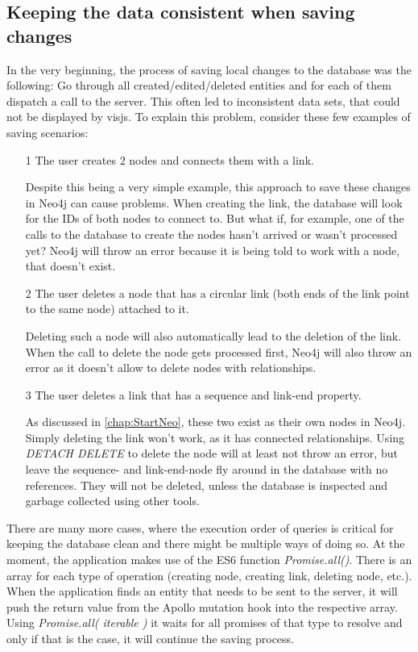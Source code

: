 \subsection{Keeping the data consistent when saving changes}
In the very beginning, the process of saving local changes to the database was the following: Go through all created/edited/deleted entities and for each of them dispatch a call to the server. This often led to inconsistent data sets, that could not be displayed by visjs. To explain this problem, consider these few examples of saving scenarios:
\begin{itemize}
\item[1] The user creates 2 nodes and connects them with a link.

Despite this being a very simple example, this approach to save these changes in Neo4j can cause problems. When creating the link, the database will look for the IDs of both nodes to connect to. But what if, for example, one of the calls to the database to create the nodes hasn't arrived or wasn't processed yet? Neo4j will throw an error because it is being told to work with a node, that doesn't exist.

\item[2] The user deletes a node that has a circular link (both ends of the link point to the same node) attached to it.

Deleting such a node will also automatically lead to the deletion of the link. When the call to delete the node gets processed first, Neo4j will also throw an error as it doesn't allow to delete nodes with relationships.

\item[3] The user deletes a link that has a sequence and link-end property.

As discussed in \autoref{chap:StartNeo}, these two exist as their own nodes in Neo4j. Simply deleting the link won't work, as it has connected relationships. Using \emph{DETACH DELETE} to delete the node will at least not throw an error, but leave the sequence- and link-end-node fly around in the database with no references. They will not be deleted, unless the database is inspected and garbage collected using other tools.
\end{itemize}

There are many more cases, where the execution order of queries is critical for keeping the database clean and there might be multiple ways of doing so. At the moment, the application makes use of the ES6 function \emph{Promise.all()}. There is an array for each type of operation (creating node, creating link, deleting node, etc.). When the application finds an entity that needs to be sent to the server, it will push the return value from the Apollo mutation hook into the respective array. Using \emph{Promise.all( iterable )} it waits for all promises of that type to resolve and only if that is the case, it will continue the saving process.

